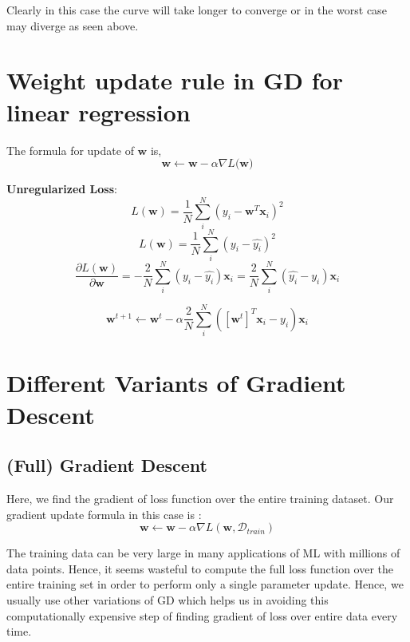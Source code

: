 \documentclass{report}
\newcommand{\D}{\mathcal{D}}
\begin{document}
Clearly in this case the curve will take longer to converge or in the worst case may diverge as seen above.

\section{Weight update rule in GD for linear regression}

The formula for update of $\textbf{w}$ is,
\begin{equation}
  \label{eqn:1}
  \textbf{w} \leftarrow \textbf{w} -\alpha \nabla L(\textbf{w)}
\end{equation}

\textbf{Unregularized Loss}:
\begin{equation}
  \label{eqn:2}
  L(\textbf{w}) = \frac{1}{N}\sum_{i}^N(y_{i} - \textbf{w}^{T}\textbf{x}_{i})^2
\end{equation}
\begin{equation}
  \label{eqn:2}
  L(\textbf{w}) = \frac{1}{N}\sum_{i}^N(y_{i} - \hat{y_i})^2
\end{equation}
\begin{equation}
  \label{eqn:3}
  \frac{\partial L(\textbf{w})}{\partial \mathbf{w}} = -\frac{2}{N} \sum_{i}^N(y_{i} - \hat{y_{i}})\mathbf{x}_i = \frac{2}{N} \sum_{i}^N(\hat{y_{i}} - y_{i})\mathbf{x}_i
\end{equation}

$$\boxed{\mathbf{w}^{t+1} \leftarrow \mathbf{w}^{t} - \alpha \frac{2}{N}\sum_{i}^N([\mathbf{w}^t]^T\mathbf{x}_i - y_{i})\mathbf{x}_i}$$

\section{Different Variants of Gradient Descent}
\subsection{(Full) Gradient Descent}

Here, we find the gradient of loss function over the entire training dataset. Our gradient update formula in this case is :
$$
  \textbf{w} \leftarrow \textbf{w} -\alpha \nabla L(\textbf{w}, \D_{train})
$$

The training data can be very large in many applications of ML with millions of data points. Hence, it seems wasteful to compute the full loss function over the entire training set in order to perform only a single parameter update. Hence, we usually use other variations of GD which helps us in avoiding this computationally expensive step of finding gradient of loss over entire data every time.
\end{document}
